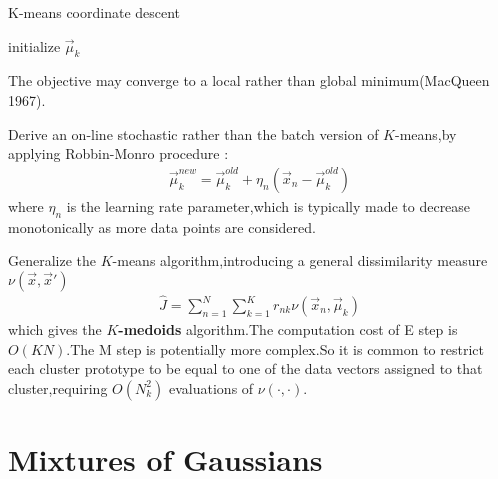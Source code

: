 \begin{algorithm}[H]
	\caption{{\sc K-means} coordinate descent}
	\label{algo:K-means}
	 initialize $\vec{\mu}_k$\;

\end{algorithm}

The objective may converge to a local rather than global minimum(MacQueen 1967).

Derive an on-line stochastic rather than the batch version of $K$-means,by applying Robbin-Monro procedure :
\begin{align}
\vec{\mu}_k^{new} = 
\vec{\mu}_k^{old} + \eta_n(\vec{x}_n-\vec{\mu}_k^{old})
\end{align}
where $\eta_n$ is the learning rate parameter,which is typically made to decrease monotonically as more data points are considered.

Generalize the $K$-means algorithm,introducing a general dissimilarity measure $\nu(\vec{x},\vec{x}')$
\begin{align}
\hat{J} = \sum_{n=1}^{N}\sum_{k=1}^{K}r_{nk}\nu(\vec{x}_n,\vec{\mu}_k)
\end{align}
which gives the \textbf{$K$-medoids} algorithm.The computation cost of E step is $O(KN)$.The M step is potentially more complex.So it is common to restrict each cluster prototype to be equal to one of the data vectors assigned to that cluster,requiring $O(N_k^2)$ evaluations of $\nu(\cdot,\cdot)$.

\section{Mixtures of Gaussians}
